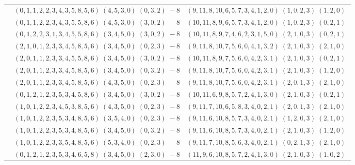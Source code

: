 \documentclass[11pt]{article}
\begin{document}
\begin{longtable}[l]{|c|c|c|}
 \cline{2-3} 
 & $(0 ,1 ,1 ,2 ,2 ,3 ,4 ,3 ,5 ,8 ,5 ,6) \;(4 ,5 ,3 ,0) \;(0 ,3 ,2) \;-8$ & $(9 ,11 ,8 ,10 ,6 ,5 ,7 ,3 ,4 ,1 ,2 ,0) \;(1 ,0 ,2 ,3) \;(1 ,2 ,0) \;$\\ 
 \cline{2-3} 
 & $(0 ,1 ,1 ,2 ,2 ,3 ,4 ,3 ,5 ,5 ,8 ,6) \;(4 ,5 ,3 ,0) \;(3 ,0 ,2) \;-8$ & $(10 ,11 ,8 ,9 ,6 ,5 ,7 ,3 ,4 ,1 ,2 ,0) \;(1 ,0 ,2 ,3) \;(0 ,2 ,1) \;$\\ 
 \cline{2-3} 
 & $(0 ,1 ,2 ,2 ,3 ,1 ,3 ,4 ,5 ,5 ,8 ,6) \;(3 ,4 ,5 ,0) \;(3 ,0 ,2) \;-8$ & $(10 ,11 ,8 ,9 ,7 ,4 ,6 ,2 ,3 ,1 ,5 ,0) \;(2 ,1 ,0 ,3) \;(0 ,2 ,1) \;$\\ 
 \cline{2-3} 
 & $(2 ,1 ,0 ,1 ,2 ,3 ,3 ,4 ,5 ,8 ,5 ,6) \;(3 ,4 ,5 ,0) \;(0 ,2 ,3) \;-8$ & $(9 ,11 ,8 ,10 ,7 ,5 ,6 ,0 ,4 ,1 ,3 ,2) \;(2 ,1 ,0 ,3) \;(2 ,1 ,0) \;$\\ 
 \cline{2-3} 
 & $(2 ,0 ,1 ,1 ,2 ,3 ,3 ,4 ,5 ,5 ,8 ,6) \;(3 ,4 ,5 ,0) \;(3 ,0 ,2) \;-8$ & $(10 ,11 ,8 ,9 ,7 ,5 ,6 ,0 ,4 ,2 ,3 ,1) \;(2 ,1 ,0 ,3) \;(0 ,2 ,1) \;$\\ 
 \cline{2-3} 
 & $(2 ,0 ,1 ,1 ,2 ,3 ,3 ,4 ,5 ,8 ,5 ,6) \;(3 ,4 ,5 ,0) \;(0 ,3 ,2) \;-8$ & $(9 ,11 ,8 ,10 ,7 ,5 ,6 ,0 ,4 ,2 ,3 ,1) \;(2 ,1 ,0 ,3) \;(1 ,2 ,0) \;$\\ 
 \cline{2-3} 
 & $(2 ,0 ,1 ,1 ,2 ,3 ,3 ,4 ,5 ,8 ,5 ,6) \;(4 ,3 ,5 ,0) \;(0 ,2 ,3) \;-8$ & $(9 ,11 ,8 ,10 ,7 ,5 ,6 ,0 ,4 ,2 ,3 ,1) \;(2 ,0 ,1 ,3) \;(2 ,1 ,0) \;$\\ 
 \cline{2-3} 
 & $(0 ,1 ,2 ,1 ,2 ,3 ,5 ,3 ,4 ,5 ,8 ,6) \;(3 ,4 ,5 ,0) \;(3 ,0 ,2) \;-8$ & $(10 ,11 ,6 ,9 ,8 ,5 ,7 ,2 ,4 ,1 ,3 ,0) \;(2 ,1 ,0 ,3) \;(0 ,2 ,1) \;$\\ 
 \cline{2-3} 
 & $(1 ,0 ,1 ,2 ,2 ,3 ,4 ,5 ,3 ,8 ,5 ,6) \;(4 ,3 ,5 ,0) \;(0 ,2 ,3) \;-8$ & $(9 ,11 ,7 ,10 ,6 ,5 ,8 ,3 ,4 ,0 ,2 ,1) \;(2 ,0 ,1 ,3) \;(2 ,1 ,0) \;$\\ 
 \cline{2-3} 
 & $(1 ,0 ,1 ,2 ,2 ,3 ,5 ,3 ,4 ,8 ,5 ,6) \;(3 ,5 ,4 ,0) \;(0 ,2 ,3) \;-8$ & $(9 ,11 ,6 ,10 ,8 ,5 ,7 ,3 ,4 ,0 ,2 ,1) \;(1 ,2 ,0 ,3) \;(2 ,1 ,0) \;$\\ 
 \cline{2-3} 
 & $(1 ,0 ,1 ,2 ,2 ,3 ,5 ,3 ,4 ,8 ,5 ,6) \;(3 ,4 ,5 ,0) \;(0 ,3 ,2) \;-8$ & $(9 ,11 ,6 ,10 ,8 ,5 ,7 ,3 ,4 ,0 ,2 ,1) \;(2 ,1 ,0 ,3) \;(1 ,2 ,0) \;$\\ 
 \cline{2-3} 
 & $(1 ,0 ,1 ,2 ,2 ,3 ,3 ,5 ,4 ,8 ,5 ,6) \;(5 ,3 ,4 ,0) \;(0 ,2 ,3) \;-8$ & $(9 ,11 ,7 ,10 ,8 ,5 ,6 ,3 ,4 ,0 ,2 ,1) \;(0 ,2 ,1 ,3) \;(2 ,1 ,0) \;$\\ 
 \cline{2-3} 
 & $(0 ,1 ,2 ,1 ,2 ,3 ,5 ,3 ,4 ,6 ,5 ,8) \;(3 ,4 ,5 ,0) \;(2 ,3 ,0) \;-8$ & $(11 ,9 ,6 ,10 ,8 ,5 ,7 ,2 ,4 ,1 ,3 ,0) \;(2 ,1 ,0 ,3) \;(1 ,0 ,2) \;$\\ 

\end{longtable}
\end{document}
